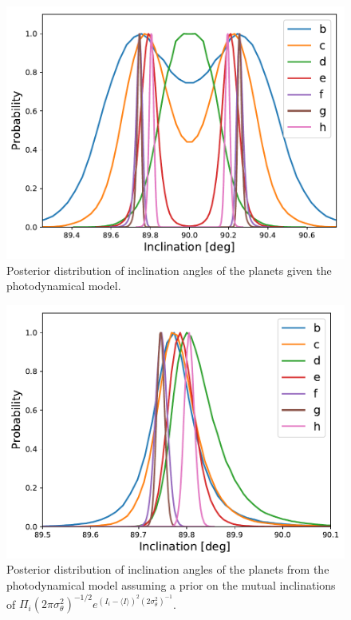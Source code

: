\documentclass[fleqn,usenatbib]{mnras} %
\begin{document}
\begin{figure}
    \centering
    \includegraphics[width=\hsize]{figures/inclination_noprior.pdf}
    \caption{Posterior distribution of inclination angles of the planets given
    the photodynamical model.}
    \label{fig:inclination_distribution}
\end{figure}

\begin{figure}
    \centering
    \includegraphics[width=\hsize]{figures/inclination_nouprior_incprior.pdf}
    \caption{Posterior distribution of inclination angles of the planets from the photodynamical model assuming
    a prior on the mutual inclinations of $\Pi_i (2\pi\sigma_\theta^2)^{-1/2} e^{(I_i-\langle I\rangle)^2(2\sigma_\theta^2)^{-1}}$.}
    \label{fig:inclination_prior}
\end{figure}
\end{document}
